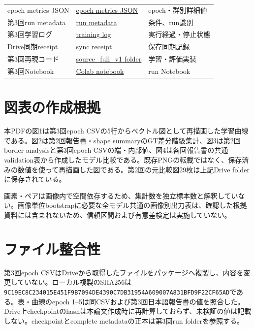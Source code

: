 \begin{longtable}{p{}p{}p{}}
epoch metrics JSON&\href{https://drive.google.com/file/d/1VgRC6HboXjYBlQhm3wO8mJZpcVWFVX0q/view}{epoch metrics JSON}&epoch・群別詳細値\\
第3回run metadata&\href{https://drive.google.com/file/d/1chvwnVW9hMf7TdWpTdyK36pqmjC6t4ps/view}{run metadata}&条件、run識別\\
第3回学習ログ&\href{https://drive.google.com/file/d/1vnJer46u7bRmgL7XDUJoq3uhjG2E_91O/view}{training log}&実行経過・停止状態\\
Drive同期receipt&\href{https://drive.google.com/file/d/1wd0pB6A3iRpy5YRsqKIVQkEU053eg1xB/view}{sync receipt}&保存同期記録\\
第3回再現コード&\href{https://drive.google.com/drive/folders/1bXiGrNYgJ273D57jnXMLts9VFgYUn4TC}{source\_full\_v1 folder}&学習・評価実装\\
第3回Notebook&\href{https://drive.google.com/file/d/10_y0J-ttoonRJKPcAC0ZU57saEbJytAm/view}{Colab notebook}&run Notebook\\
\bottomrule
\end{longtable}

\section{図表の作成根拠}
本PDFの図1は第3回epoch CSVの5行からベクトル図として再描画した学習曲線である。図2は第2回報告書・shape summaryのGT差分階級集計、図3は第2回border analysisと第3回epoch CSVの端・内部値、図4は各回報告書の共通validation表から作成したモデル比較である。既存PNGの転載ではなく、保存済みの数値を使って再描画した図である。第2回の元比較図29枚は上記Drive folderに保存されている。

画素・ペアは画像内で空間依存するため、集計数を独立標本数と解釈していない。画像単位bootstrapに必要な全モデル共通の画像別出力表は、確認した根拠資料には含まれないため、信頼区間および有意差検定は実施していない。

\section{ファイル整合性}
第3回epoch CSVはDriveから取得したファイルをパッケージへ複製し、内容を変更していない。ローカル複製のSHA256は\texttt{9C19EC8C\allowbreak 234015E4\allowbreak 51F9B709\allowbreak 4DE4390C\allowbreak 7DB31954\allowbreak A609007A\allowbreak 831BFD9F\allowbreak 22CF65AD}である。表・曲線のepoch 1--5は同CSVおよび第3回日本語報告書の値を照合した。Drive上checkpointのhashは本論文作成時に再計算しておらず、未検証の値は記載しない。checkpointとcomplete metadataの正本は第3回run folderを参照する。
